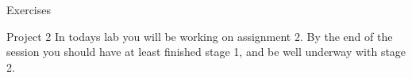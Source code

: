 \documentclass{beamer}
\begin{document}
\begin{frame}{Exercises}
    \begin{block}{Project 2}
        In todays lab you will be working on assignment 2. By the end of
        the session you should have at least finished stage 1, and be well
        underway with stage 2.
    \end{block}
\end{frame}

%
%
\end{document}
